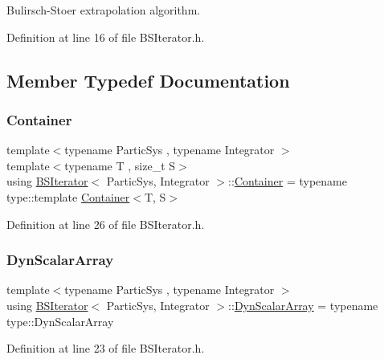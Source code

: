 Bulirsch-\/\+Stoer extrapolation algorithm. 

Definition at line 16 of file B\+S\+Iterator.\+h.



\subsection{Member Typedef Documentation}
\mbox{\label{class_b_s_iterator_a1cb5a9b8f7ff3746a15007780c9a7b87}} 
\subsubsection{\texorpdfstring{Container}{Container}}
{\footnotesize\ttfamily template$<$typename Partic\+Sys , typename Integrator $>$ \\
template$<$typename T , size\+\_\+t S$>$ \\
using \mbox{\hyperlink{class_b_s_iterator}{B\+S\+Iterator}}$<$ Partic\+Sys, Integrator $>$\+::\mbox{\hyperlink{class_b_s_iterator_a1cb5a9b8f7ff3746a15007780c9a7b87}{Container}} =  typename type\+::template \mbox{\hyperlink{class_b_s_iterator_a1cb5a9b8f7ff3746a15007780c9a7b87}{Container}}$<$T, S$>$}



Definition at line 26 of file B\+S\+Iterator.\+h.

\mbox{\label{class_b_s_iterator_a9a340a2f29d147d137a7459886736dd6}} 
\subsubsection{\texorpdfstring{Dyn\+Scalar\+Array}{DynScalarArray}}
{\footnotesize\ttfamily template$<$typename Partic\+Sys , typename Integrator $>$ \\
using \mbox{\hyperlink{class_b_s_iterator}{B\+S\+Iterator}}$<$ Partic\+Sys, Integrator $>$\+::\mbox{\hyperlink{class_b_s_iterator_a9a340a2f29d147d137a7459886736dd6}{Dyn\+Scalar\+Array}} =  typename type\+::\+Dyn\+Scalar\+Array}



Definition at line 23 of file B\+S\+Iterator.\+h.

